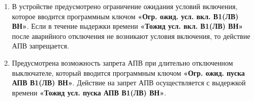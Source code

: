 \documentclass[a4paper, 12pt, table, hidelinks, DIV=calc]{extarticle}
\begin{document}
\begin{enumerate}[label=\arabic{section}.\arabic{subsection}.\arabic*,  align=left, labelsep=4pt, leftmargin=0pt, itemindent=57pt]
\item
В устройстве предусмотрено ограничение ожидания условий включения, которое вводится программным ключом \textbf{«Огр. ожид. усл. вкл. В1(ЛВ) ВН»}. Если в течение выдержки времени \textbf{«Тожид усл. вкл. В1(ЛВ) ВН»} после аварийного отключения не возникают условия включения, то действие АПВ запрещается.

\item
Предусмотрена возможность запрета АПВ при длительно отключенном выключателе, который вводится программным ключом \textbf{«Огр. ожид. пуска АПВ В1(ЛВ) ВН»}. Действие на запрет АПВ осуществляется с выдержкой времени \textbf{«Тожид усл. пуска АПВ В1(ЛВ) ВН»}.


\end{enumerate}
\color{black}
\end{document}

